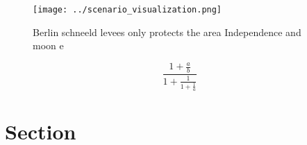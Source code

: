 \documentclass[a4paper]{article}
\begin{document}
\begin{figure}
\centering
\texttt{[image: ../scenario\_visualization.png]}
\caption{Berlin schneeld levees only protects the area Independence and moon e
}
\end{figure}
 
\[ \frac{1+\frac{a}{b}}{1+\frac{1}{1+\frac{1}{a}}} \]

\section{Section}
\end{document}
